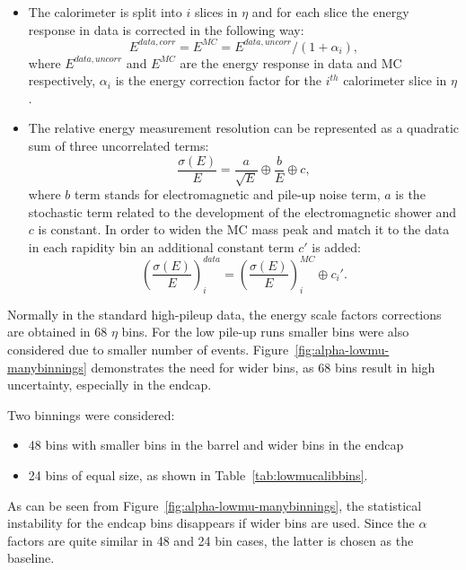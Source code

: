     \begin{itemize}
    	\item The calorimeter is split into $i$ slices in $\eta$ and for each slice the energy response in data is corrected in the following way:
    	\begin{equation*}
    		E^{data,corr}=E^{MC}=E^{data,uncorr}/(1+\alpha_i),
    	\end{equation*}
    	where $E^{data,uncorr}$ and $E^{MC}$ are the energy response in data and MC respectively, $\alpha_i$ is the energy correction factor for the $i^{th}$ calorimeter slice in $\eta$.
    	\item The relative energy measurement resolution can be represented as a quadratic sum of three uncorrelated terms:
    	\begin{equation*}
    	\frac{\sigma(E)}{E}=\frac{a}{\sqrt{E}} \oplus \frac{b}{E} \oplus c,
    	\end{equation*}
    	where $b$ term stands for electromagnetic and pile-up noise term, $a$ is the stochastic term related to the development of the electromagnetic shower and $c$ is constant. In order to widen the MC mass peak and match it to the data in each rapidity bin an additional constant term $c'$ is added: 
    	\begin{equation*}
    	\left(\frac{\sigma(E)}{E}\right)^{data}_i= \left(\frac{\sigma(E)}{E}\right)^{MC}_i \oplus c_i'.
    	\end{equation*}
    \end{itemize}

Normally in the standard high-pileup data, the energy scale factors corrections are obtained in 68 $\eta$ bins.
For the low pile-up runs smaller bins were also considered due to smaller number of \Zee events. 
Figure~\ref{fig:alpha-lowmu-manybinnings} demonstrates the need for wider bins, as 68 bins result in high uncertainty, especially in the endcap.

Two binnings were considered:
\begin{itemize}
	\item 48 bins with smaller bins in the barrel and wider bins in the endcap
	\item 24 bins of equal size, as shown in Table~\ref{tab:lowmucalibbins}.
\end{itemize}
 As can be seen from Figure~\ref{fig:alpha-lowmu-manybinnings}, the
statistical instability for the endcap bins disappears if wider bins are used. 
Since the $\alpha$ factors are quite similar in 48 and 24 bin cases, the latter is chosen as the baseline.

